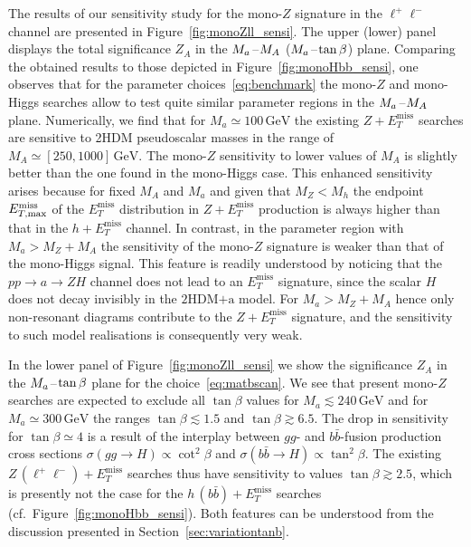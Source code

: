 \documentclass[review]{elsarticle}
\newcommand{\MET}{\ensuremath{E_T^\mathrm{miss}}\xspace}
\newcommand{\mA}{\ensuremath{M_{A}}\xspace}
\newcommand{\ma}{\ensuremath{M_{a}}\xspace}
\newcommand{\hdma}{\ensuremath{\textrm{2HDM+a}}\xspace}
\begin{document}
The results of our sensitivity study for the mono-$Z$ signature in the $\ell^+ \ell^-$ channel are presented in Figure~\ref{fig:monoZll_sensi}. The upper (lower) panel displays the total significance $Z_A$  in the $\ma\hspace{0.25mm}$--$\hspace{0.25mm}\mA$ ($\ma\hspace{0.25mm}$--$\hspace{0.25mm}\tan \beta$) plane. Comparing the obtained results to those depicted in Figure~\ref{fig:monoHbb_sensi}, one observes that for the parameter choices~\eqref{eq:benchmark} the mono-$Z$ and mono-Higgs searches allow to test quite similar parameter regions in the $\ma\hspace{0.25mm}$--$\hspace{0.25mm}\mA$ plane. Numerically, we find  that for $\ma \simeq 100 \, {\mathrm{GeV}}$  the existing $Z + \MET$ searches are sensitive to 2HDM pseudoscalar masses  in the range of $\mA \simeq [250, 1000] \, {\mathrm{GeV}}$. The mono-$Z$ sensitivity to lower values of $M_A$ is slightly better than the one found in the mono-Higgs case. This enhanced sensitivity arises because for fixed $M_A$ and $M_a$ and given that $M_Z < M_h$ the endpoint $E_{T, \rm max}^{\rm miss}$ of the $\MET$ distribution in $Z+ \MET$ production is always higher  than that in  the $h+ \MET$ channel. In contrast, in the parameter region with $M_a > M_Z + M_A$ the sensitivity of the mono-$Z$ signature is weaker than that of the mono-Higgs  signal. This feature is readily understood by noticing that the $pp \to a \to Z H$ channel does not lead to an $\MET$ signature, since the scalar $H$ does not decay invisibly in the \hdma model. For $M_a > M_Z + M_A$ hence only non-resonant diagrams contribute to the $Z+\MET$ signature, and the sensitivity to such model realisations is consequently very weak. 

 In the lower panel of Figure~\ref{fig:monoZll_sensi} we show the significance $Z_A$ in the $\ma\hspace{0.25mm}$--$\hspace{0.25mm}\tan \beta$ plane for the choice~\eqref{eq:matbscan}.  We see that present mono-$Z$ searches are expected to exclude all $\tan \beta$ values for $M_a \lesssim 240 \, {\mathrm{GeV}}$ and for $M_a \simeq 300 \, {\mathrm{GeV}}$ the ranges $\tan \beta \lesssim 1.5$ and $\tan \beta \gtrsim 6.5$. The drop in sensitivity for $\tan \beta \simeq 4$ is a result of the interplay between $gg$- and $b \bar b$-fusion production cross sections $\sigma ( g g \to H ) \propto \cot^2 \beta$ and $\sigma ( b \bar b  \to H ) \propto \tan^2 \beta$. The existing $Z \, (\ell^+ \ell^-) + \MET$ searches thus have sensitivity to  values $\tan \beta \gtrsim 2.5$, which is presently not the case for the $h \, (b \bar b) + \MET$ searches (cf.~Figure~\ref{fig:monoHbb_sensi}). Both features can be understood from the discussion presented in Section~\ref{sec:variationtanb}.
 
\end{document}
